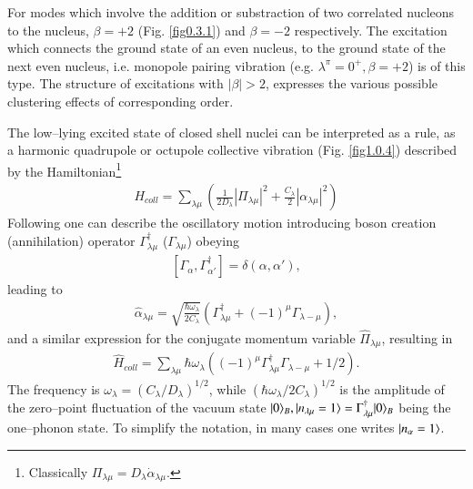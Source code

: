 For modes which involve the addition or substraction of two correlated nucleons to the nucleus, $\beta=+2$ (Fig. \ref{fig0.3.1}) and $\beta=-2$ respectively. The excitation which connects the ground state of an even nucleus, to the ground state of the next even nucleus, i.e. monopole pairing vibration (e.g. $\lambda^\pi=0^+, \beta=+2$) is of this type.
The structure of excitations with $|\beta|>2$, expresses the various possible clustering effects of corresponding order.

The low--lying excited state of closed shell nuclei can be interpreted as a rule, as a harmonic quadrupole or octupole collective vibration (Fig. \ref{fig1.0.4}) described by the Hamiltonian\footnote{Classically $\Pi_{\lambda\mu}=D_\lambda\dot\alpha_{\lambda\mu}$.}
\begin{align}\label{eq1.0.7}
H_{coll}=\sum_{\lambda\mu}\left(\frac{1}{2D_{\lambda}}|\Pi_{\lambda\mu}|^2+\frac{C_\lambda}{2}|\alpha_{\lambda\mu}|^2\right)
\end{align}
Following \cite{Dirac:26} one can describe the oscillatory motion introducing boson creation (annihilation) operator $\Gamma_{\lambda\mu}^\dagger$ ($\Gamma_{\lambda\mu}$) obeying
\begin{align}\label{eq1.0.8}
\left[\Gamma_{\alpha},\Gamma_{\alpha'}^\dagger\right]=\delta(\alpha,\alpha'),
\end{align}
leading to 
\begin{align}\label{eq1.0.9}
\hat\alpha_{\lambda\mu}=\sqrt{\frac{\hbar\omega_\lambda}{2C_\lambda}}\left(\Gamma_{\lambda\mu}^\dagger+(-1)^\mu\Gamma_{\lambda-\mu}\right),
\end{align}
and a similar expression for the conjugate momentum variable $\hat\Pi_{\lambda\mu}$, resulting in 
\begin{align}\label{eq1.0.9b}
\hat H_{coll}=\sum_{\lambda\mu}\hbar\omega_\lambda\left((-1)^\mu\Gamma_{\lambda\mu}^\dagger\Gamma_{\lambda-\mu}+1/2\right).
\end{align}
The frequency is $\omega_\lambda=(C_\lambda/D_\lambda)^{1/2}$, while $(\hbar\omega_\lambda/2C_\lambda)^{1/2}$ is the amplitude of the zero--point fluctuation of the vacuum state $|{0} \rangle_B,|{n_{\lambda\mu}=1} \rangle=\Gamma_{\lambda\mu}^\dagger |{0} \rangle_B$ being the one--phonon state. To simplify the notation, in many cases one writes $|{n_\alpha=1} \rangle$.
